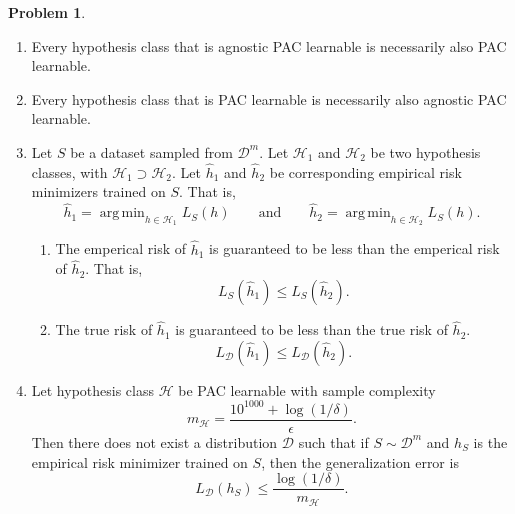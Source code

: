 \documentclass[10pt]{article}
\theoremstyle{definition}
\newtheorem{problem}{Problem}
\DeclareMathOperator*{\argmin}{arg\,min}
\begin{document}
\begin{problem}
\begin{enumerate}
        \item Every hypothesis class that is agnostic PAC learnable is necessarily also PAC learnable.
            \vspace{4in}

        \item Every hypothesis class that is PAC learnable is necessarily also agnostic PAC learnable.
            \vspace{4in}

        \newpage
        \item 
            Let $S$ be a dataset sampled from $\mathcal D^m$.
            Let $\mathcal H_1$ and $\mathcal H_2$ be two hypothesis classes,
            with $\mathcal H_1 \supset \mathcal H_2$.
            Let $\hat h_1$ and $\hat h_2$ be corresponding empirical risk minimizers trained on $S$.
            That is,
            \begin{equation}
                \hat h_1 = \argmin_{h \in \mathcal H_1} L_S(h)
                \qquad\text{and}\qquad
                \hat h_2 = \argmin_{h \in \mathcal H_2} L_S(h)
                .
            \end{equation}
            \begin{enumerate}
                \item The emperical risk of $\hat h_1$ is guaranteed to be less than the emperical risk of $\hat h_2$.
                    That is,
                    \begin{equation}
                        L_S(\hat h_1) \le L_S(\hat h_2)
                        .
                    \end{equation}
                    \vspace{3in}

                \item The true risk of $\hat h_1$ is guaranteed to be less than the true risk of $\hat h_2$.
                    \begin{equation}
                        L_\mathcal D(\hat h_1) \le L_\mathcal D(\hat h_2)
                        .
                    \end{equation}
                    \vspace{3in}
            \end{enumerate}

        \newpage
        \item
            Let hypothesis class $\mathcal H$ be PAC learnable with sample complexity
            \begin{equation}
                m_\mathcal H = \frac{10^{1000} + \log(1/\delta)}{\epsilon}
                .
            \end{equation}
            Then there does not exist a distribution $\mathcal D$ such that if $S\sim\mathcal D^m$ and $h_S$ is the empirical risk minimizer trained on $S$,
            then the generalization error is
            \begin{equation}
                L_\mathcal D (h_S) \le \frac {\log (1/\delta)} {m_\mathcal H}
                .
            \end{equation}




\end{enumerate}
\end{problem}
\end{document}
